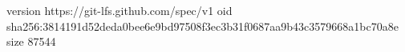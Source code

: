 version https://git-lfs.github.com/spec/v1
oid sha256:3814191d52deda0bee6e9bd97508f3ec3b31f0687aa9b43c3579668a1bc70a8e
size 87544

